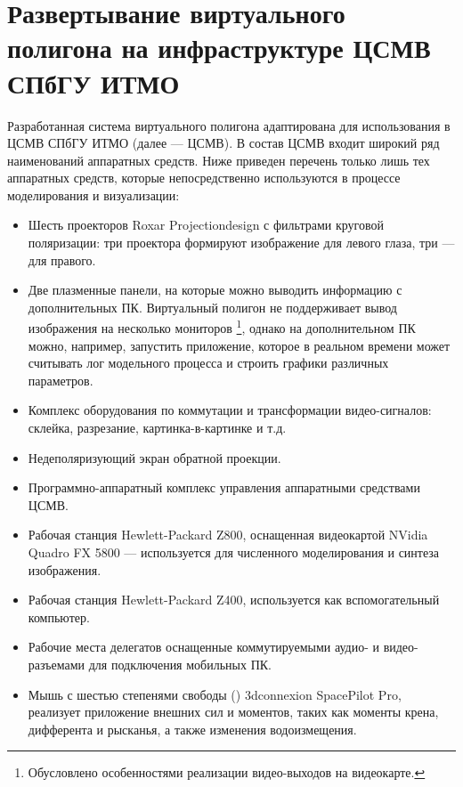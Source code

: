 
\section{Развертывание виртуального полигона на инфраструктуре ЦСМВ СПбГУ ИТМО}

Разработанная система виртуального полигона адаптирована для использования в ЦСМВ СПбГУ ИТМО (далее --- ЦСМВ).
В состав ЦСМВ входит широкий ряд наименований аппаратных средств. Ниже приведен перечень только лишь тех аппаратных средств, которые непосредственно используются в процессе моделирования и визуализации:

\begin{itemize}
	\item	Шесть проекторов Roxar Projectiondesign с фильтрами круговой поляризации: три проектора формируют 
			изображение для левого глаза, три --- для правого.
	\item	Две плазменные панели, на которые можно выводить информацию с дополнительных ПК. 
			Виртуальный полигон не поддерживает вывод изображения на несколько мониторов
			\footnote{Обусловлено особенностями реализации видео-выходов на видеокарте.}, 
			однако на дополнительном ПК можно, например, запустить приложение, которое 
			в реальном времени может считывать лог модельного процесса и строить графики различных 
			параметров.
	\item	Комплекс оборудования по коммутации и трансформации видео-сигналов: 
			склейка, разрезание, картинка-в-картинке и т.д.
	\item	Недеполяризующий экран обратной проекции.
	\item	Программно-аппаратный комплекс управления аппаратными средствами ЦСМВ.
	\item	Рабочая станция Hewlett-Packard Z800, оснащенная видеокартой NVidia Quadro FX 5800
			 --- используется для численного моделирования и синтеза изображения.
	\item	Рабочая станция Hewlett-Packard Z400, используется как вспомогательный компьютер.
	\item	Рабочие места делегатов оснащенные коммутируемыми аудио- и видео-разъемами для подключения
			мобильных ПК.
	\item	Мышь с шестью степенями свободы () 3dconnexion SpacePilot Pro, реализует приложение внешних сил и моментов, таких как моменты крена, дифферента и рысканья, а также изменения водоизмещения.

	
	
\end{itemize}

